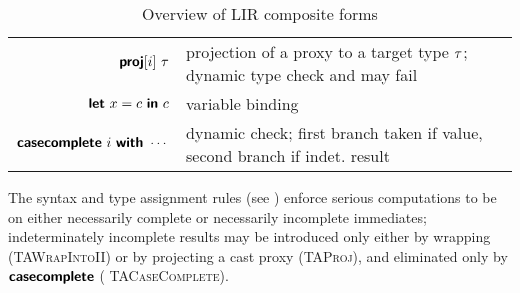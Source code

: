 \documentclass[index.tex]{subfiles}
\begin{document}
\begin{table}
\begin{center}
\begin{tabular}{rl}
      $\textsf{\textbf{proj}}[i]~ \tau$
        & projection of a proxy to a target type $\tau$; dynamic type check and may fail \\

      $\textsf{\textbf{{let}}}~ x = c ~\textsf{\textbf{{in}}}~ c$
        & variable binding \\

      $\textsf{\textbf{casecomplete}}~ i ~\textsf{\textbf{{with}}} ~\cdots$
        & dynamic check; first branch taken if value, second branch if indet. result
    \end{tabular}
  \end{center}
  \caption{Overview of LIR composite forms}
  \label{fig:lir-syntax-comp}
\end{table}

The syntax and type assignment rules (see ) enforce serious computations to be
on either necessarily complete or necessarily incomplete immediates; indeterminately incomplete
results may be introduced only either by wrapping (\textsc{\small TAWrapIntoII}) or by projecting a
cast proxy (\textsc{\small TAProj}), and eliminated only by $\textsf{\textbf{casecomplete}}$ (\textsc{\small
TACaseComplete}).
\end{document}
